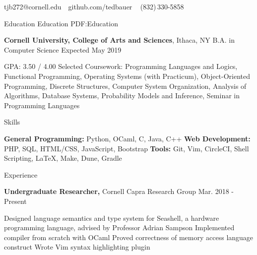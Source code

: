 \documentclass[letterpaper,MMMyyyy,nonstopmode]{simpleresumecv}
\newcommand{\CVAuthor}{Theodore Bauer}
\begin{document}

\Title{\CVAuthor}

\begin{SubTitle}
tjb272@cornell.edu
\,\SubBulletSymbol\,
github.com/tedbauer
\,\SubBulletSymbol\,
\,(832)\,330-5858
\end{SubTitle}

\begin{Body}

\Section
{Education}
{Education}
{PDF:Education}

\Entry
{\textbf{Cornell University, College of Arts and Sciences}},
Ithaca, NY
\Gap
\BulletItem
B.A. in Computer Science
\hfill
Expected May 2019
\begin{Detail}
\SubBulletItem
GPA: 3.50 / 4.00
\SubBulletItem
Selected Coursework: Programming Languages and Logics, Functional Programming, \newline Operating Systems (with Practicum), Object-Oriented Programming, Discrete Structures, \newline Computer System Organization, Analysis of Algorithms, Database Systems, \newline Probability Models and Inference, Seminar in Programming Languages
\end{Detail}


\Section
{Skills}
{}
{}

\textbf{General Programming:} Python, OCaml, C, Java, C++
\Gap
\textbf{Web Development:}  PHP, SQL, HTML/CSS, JavaScript, Bootstrap
\Gap
\textbf{Tools:} Git, Vim, CircleCI, Shell Scripting, \LaTeX, Make, Dune, Gradle

\Section
{Experience}{}{}

\Entry
\textbf{Undergraduate Researcher,} Cornell Capra Research Group
\hfill Mar. 2018 - Present
\Gap

\begin{Detail}
\BulletItem Designed language semantics and type system for Seashell, a hardware \newline programming language, advised by Professor Adrian Sampson
\BulletItem Implemented compiler from scratch with OCaml
\BulletItem Proved correctness of memory access language construct
\BulletItem Wrote Vim syntax highlighting plugin

\end{Detail}


\end{Body}
\end{document}
